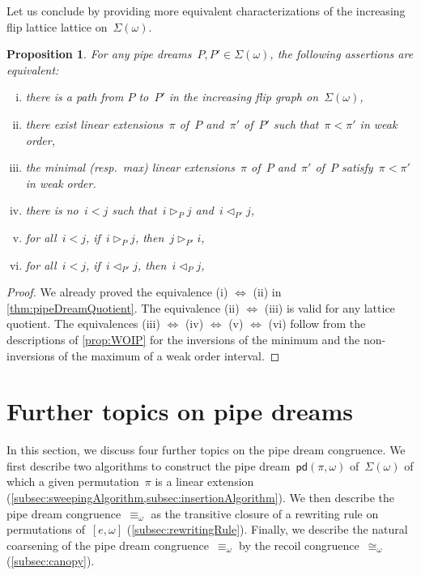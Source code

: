 \documentclass[reqno]{amsart}
\newtheorem{proposition}[theorem]{Proposition}
\theoremstyle{definition}
\newcommand{\acyclicPipeDreams}{\Sigma} %
\newcommand{\insertion}[2]{\mathsf{pd}(#1,#2)} %
\newcommand{\less}{\vartriangleleft} %
\newcommand{\more}{\vartriangleright} %
\newcommand{\contactLess}[1]{\less_{#1}} %
\newcommand{\contactMore}[1]{\more_{#1}} %
\begin{document}
Let us conclude by providing more equivalent characterizations of the increasing flip lattice lattice on~$\acyclicPipeDreams(\omega)$.

\begin{proposition}
For any pipe dreams~$P, P' \in \acyclicPipeDreams(\omega)$, the following assertions are equivalent:
\begin{enumerate}[(i)]
\item there is a path from $P$ to~$P'$ in the increasing flip graph on~$\acyclicPipeDreams(\omega)$,
\item there exist linear extensions~$\pi$ of~$P$ and~$\pi'$ of~$P'$ such that~$\pi < \pi'$ in weak order,
\item the minimal (resp.~max) linear extensions~$\pi$ of~$P$ and~$\pi'$ of~$P$ satisfy~$\pi < \pi'$ in weak order.
\item there is no~$i < j$ such that~$i \contactMore{P} j$ and~$i \contactLess{P'} j$,
\item for all~$i < j$, if~$i \contactMore{P} j$, then~$j \contactMore{P'} i$,
\item for all~$i < j$, if~$i \contactLess{P'} j$, then~$i \contactLess{P} j$,
\end{enumerate}
\end{proposition}

\begin{proof}
We already proved the equivalence (i) $\Leftrightarrow$ (ii) in \cref{thm:pipeDreamQuotient}.
The equivalence (ii) $\Leftrightarrow$ (iii) is valid for any lattice quotient.
The equivalences (iii) $\Leftrightarrow$ (iv) $\Leftrightarrow$ (v) $\Leftrightarrow$ (vi) follow from the descriptions of \cref{prop:WOIP} for the inversions of the minimum and the non-inversions of the maximum of a weak order interval.
\end{proof}


\section{Further topics on pipe dreams}
\label{sec:furtherTopics}

In this section, we discuss four further topics on the pipe dream congruence.
We first describe two algorithms to construct the pipe dream~$\insertion{\pi}{\omega}$ of~$\acyclicPipeDreams(\omega)$ of which a given permutation~$\pi$ is a linear extension (\cref{subsec:sweepingAlgorithm,subsec:insertionAlgorithm}).
We then describe the pipe dream congruence~$\equiv_\omega$ as the transitive closure of a rewriting rule on permutations of~$[e, \omega]$ (\cref{subsec:rewritingRule}).
Finally, we describe the natural coarsening of the pipe dream congruence~$\equiv_\omega$ by the recoil congruence~$\cong_\omega$ (\cref{subsec:canopy}).
\end{document}
